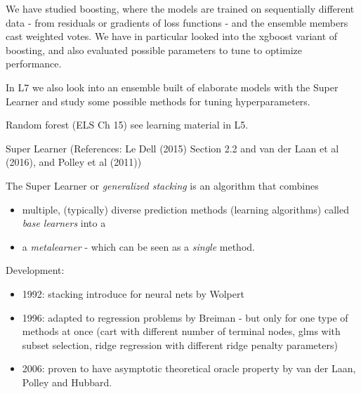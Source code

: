 \documentclass[
  ignorenonframetext,
]{beamer}
\providecommand{\tightlist}{%
  \setlength{\itemsep}{0pt}\setlength{\parskip}{0pt}}
\begin{document}
\begin{frame}
We have studied boosting, where the models are trained on sequentially
different data - from residuals or gradients of loss functions - and the
ensemble members cast weighted votes. We have in particular looked into
the xgboost variant of boosting, and also evaluated possible parameters
to tune to optimize performance.

In L7 we also look into an ensemble built of elaborate models with the
Super Learner and study some possible methods for tuning
hyperparameters.
\end{frame}

\begin{frame}{Random forest}
\protect\hypertarget{random-forest}{}
(ELS Ch 15) see learning material in L5.
\end{frame}

\begin{frame}{Super Learner}
\protect\hypertarget{super-learner}{}
(References: Le Dell (2015) Section 2.2 and van der Laan et al (2016),
and Polley et al (2011))

The Super Learner or \emph{generalized stacking} is an algorithm that
combines

\begin{itemize}
\tightlist
\item
  multiple, (typically) diverse prediction methods (learning algorithms)
  called \emph{base learners} into a
\item
  a \emph{metalearner} - which can be seen as a \emph{single} method.
\end{itemize}
\end{frame}

\begin{frame}
\begin{block}{Development:}
\protect\hypertarget{development}{}
\begin{itemize}
\tightlist
\item
  1992: stacking introduce for neural nets by Wolpert
\item
  1996: adapted to regression problems by Breiman - but only for one
  type of methods at once (cart with different number of terminal nodes,
  glms with subset selection, ridge regression with different ridge
  penalty parameters)
\item
  2006: proven to have asymptotic theoretical oracle property by van der
  Laan, Polley and Hubbard.
\end{itemize}
\end{block}
\end{frame}
\end{document}
